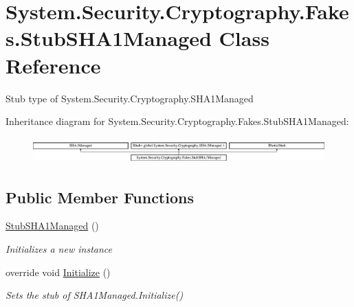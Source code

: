 \hypertarget{class_system_1_1_security_1_1_cryptography_1_1_fakes_1_1_stub_s_h_a1_managed}{\section{System.\-Security.\-Cryptography.\-Fakes.\-Stub\-S\-H\-A1\-Managed Class Reference}
\label{class_system_1_1_security_1_1_cryptography_1_1_fakes_1_1_stub_s_h_a1_managed}
}


Stub type of System.\-Security.\-Cryptography.\-S\-H\-A1\-Managed 


Inheritance diagram for System.\-Security.\-Cryptography.\-Fakes.\-Stub\-S\-H\-A1\-Managed\-:\begin{figure}[H]
\begin{center}
\leavevmode
\includegraphics[height=1.000894cm]{class_system_1_1_security_1_1_cryptography_1_1_fakes_1_1_stub_s_h_a1_managed}
\end{center}
\end{figure}
\subsection*{Public Member Functions}
\begin{DoxyCompactItemize}
\item 
\hyperlink{class_system_1_1_security_1_1_cryptography_1_1_fakes_1_1_stub_s_h_a1_managed_ac653a28446dee1fece94944e89fffa3d}{Stub\-S\-H\-A1\-Managed} ()
\begin{DoxyCompactList}\small\item\em Initializes a new instance\end{DoxyCompactList}\item 
override void \hyperlink{class_system_1_1_security_1_1_cryptography_1_1_fakes_1_1_stub_s_h_a1_managed_aa598a2a7dc89d2ad0b2d05df5b167655}{Initialize} ()
\begin{DoxyCompactList}\small\item\em Sets the stub of S\-H\-A1\-Managed.\-Initialize()\end{DoxyCompactList}\end{DoxyCompactItemize}
